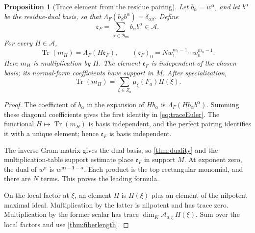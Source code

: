 \documentclass[11pt,oneside]{article}
\numberwithin{equation}{section}
\newtheorem{proposition}[theorem]{Proposition}
\theoremstyle{definition}
\theoremstyle{remark}\newtheorem{remark}[theorem]{Remark}
\newcommand{\Tr}{\operatorname{Tr}}
\newcommand{\boxset}{\mathcal B_{\boldsymbol m}}
\begin{document}
\begin{proposition}[Trace element from the residue pairing]\label{prop:Euler}
Let \(b_\alpha=w^\alpha\), and let \(b^\alpha\) be the residue-dual basis, so that \(\Lambda_F(b_\beta b^\alpha)=\delta_{\alpha\beta}\). Define
\begin{equation}\label{eq:Eulerelement}
 \mathfrak e_F=\sum_{\alpha\in\boxset}b_\alpha b^\alpha\in\mathcal A.
\end{equation}
For every \(H\in\mathcal A\),
\begin{equation}\label{eq:traceEuler}
 \Tr(m_H)=\Lambda_F(H\mathfrak e_F),
 \qquad
 (\mathfrak e_F)_0=Nw_1^{m_1-1}\cdots w_n^{m_n-1}.
\end{equation}
Here \(m_H\) is multiplication by \(H\). The element \(\mathfrak e_F\) is independent of the chosen basis; its normal-form coefficients have support in \(M\). After specialization,
\begin{equation}\label{eq:tracelength}
 \Tr(m_H)=\sum_{\xi\in Z_a}\mu_\xi(F_a)H(\xi).
\end{equation}
\end{proposition}
\begin{proof}
The coefficient of \(b_\alpha\) in the expansion of \(Hb_\alpha\) is \(\Lambda_F(Hb_\alpha b^\alpha)\). Summing these diagonal coefficients gives the first identity in \eqref{eq:traceEuler}. The functional \(H\mapsto\Tr(m_H)\) is basis independent, and the perfect pairing identifies it with a unique element; hence \(\mathfrak e_F\) is basis independent.

The inverse Gram matrix gives the dual basis, so \cref{thm:duality} and the multiplication-table support estimate place \(\mathfrak e_F\) in support \(M\). At exponent zero, the dual of \(w^\alpha\) is \(w^{\boldsymbol m-\boldsymbol1-\alpha}\). Each product is the top rectangular monomial, and there are \(N\) terms. This proves the leading formula.

On the local factor at \(\xi\), an element \(H\) is \(H(\xi)\) plus an element of the nilpotent maximal ideal. Multiplication by the latter is nilpotent and has trace zero. Multiplication by the former scalar has trace \(\dim_K\mathcal A_{a,\xi}\,H(\xi)\). Sum over the local factors and use \cref{thm:fiberlength}.
\end{proof}
\end{document}
